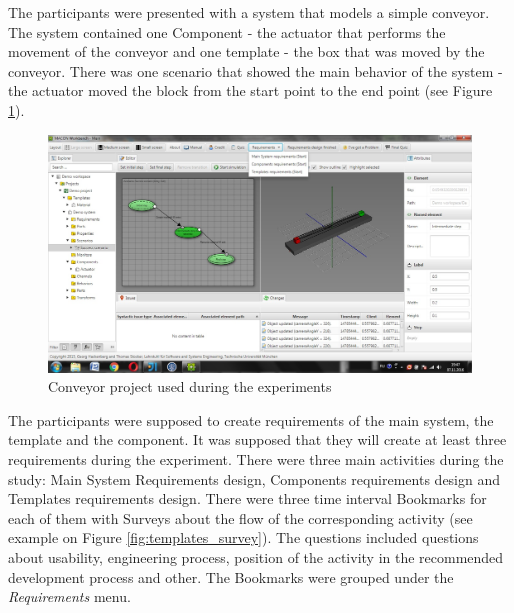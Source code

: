 The participants were presented with a system that models a simple conveyor. The system contained one Component - the actuator that performs the movement of the conveyor and one template - the box that was moved by the conveyor. There was one scenario that showed the main behavior of the system - the actuator moved the block from the start point to the end point (see Figure \ref{fig:workbench_1}).\\

\begin{figure}[htb]
 \centering
\includegraphics[width=\textwidth]{figures/workbench_1.jpg}
\caption{Conveyor project used during the experiments}
\label{fig:workbench_1}
\end{figure}

The participants were supposed to create requirements of the main system, the template and the component. It was supposed that they will create at least three requirements during the experiment. There were three main activities during the study: Main System Requirements design, Components requirements design and Templates requirements design. There were three time interval Bookmarks for each of them with Surveys about the flow of the corresponding activity (see example on Figure \ref{fig:templates_survey}). The questions included questions about usability, engineering process, position of the activity in the recommended development process and other. The Bookmarks were grouped under the \textit{Requirements} menu. \\

